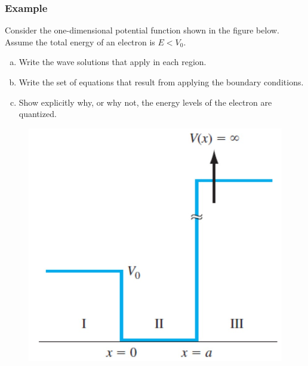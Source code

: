 \documentclass{beamer}
\begin{document}
    \begin{frame} \frametitle{Example}
        Consider the one-dimensional potential function shown in the figure below. Assume the total energy of an electron is $E < V_0$.
        \begin{enumerate}[a)]
            \item Write the wave solutions that apply in each region.
            \item Write the set of equations that result from applying the boundary conditions.
            \item Show explicitly why, or why not, the energy levels of the electron are quantized.
        \end{enumerate}
        \begin{figure}[H]
            \centering
            \includegraphics[width=0.4\linewidth]{Example-quantum-well.jpg}
            \label{fig:Example-quantum-well.jpg}
        \end{figure}
    \end{frame}
\end{document}
